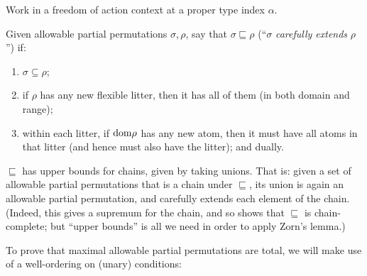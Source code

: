 \begin{definition}
  \label{def:allowable-partial-perm-order}
  Work in a freedom of action context at a proper type index $\alpha$.

  Given allowable partial permutations $\sigma, \rho$, say that $\sigma \sqsubseteq \rho$ (“$\sigma$ \emph{carefully extends} $\rho$”) if:

  \begin{enumerate}
  \item $\sigma \subseteq \rho$;
  \item if $\rho$ has any new flexible litter, then it has all of them (in both domain and range);
  \item within each litter, if $\mathrm{dom} \rho$ has any new atom, then it must have all atoms in that litter (and hence must also have the litter); and dually.
  \end{enumerate}
\end{definition}

\begin{proposition}
  \label{prop:allowable-partial-perm-chain-union}
  $\sqsubseteq$ has upper bounds for chains, given by taking unions.  That is: given a set of allowable partial permutations that is a chain under $\sqsubseteq$, its union is again an allowable partial permutation, and carefully extends each element of the chain.  (Indeed, this gives a supremum for the chain, and so shows that $\sqsubseteq$ is chain-complete; but “upper bounds” is all we need in order to apply Zorn’s lemma.)
\end{proposition}

To prove that maximal allowable partial permutations are total, we will make use of a well-ordering on (unary) conditions:

